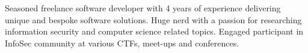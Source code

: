

\begin{cvparagraph}

Seasoned freelance software developer with 4 years of experience delivering unique and bespoke software solutions. Huge nerd with a passion for researching information security and computer science related topics. Engaged participant in InfoSec community at various CTFs, meet-ups and conferences.

\end{cvparagraph}
